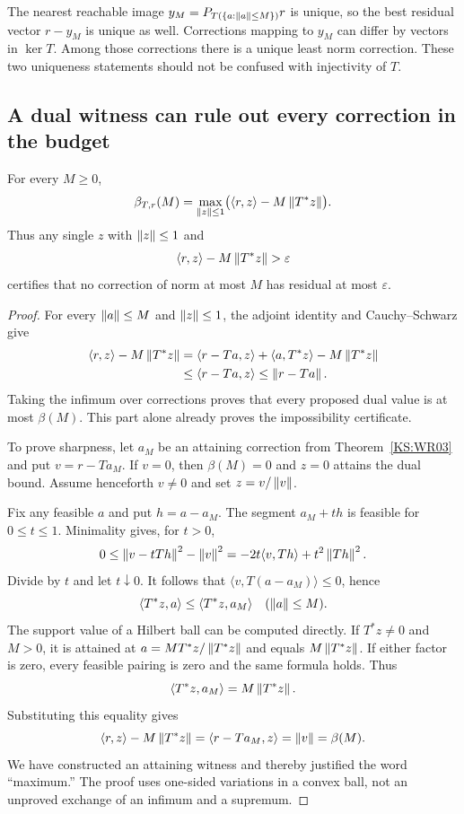 The nearest reachable image $y_M=P_{T(\{a:\left\lVert a\right\rVert\le M\})}r$ is unique, so the best residual vector $r-y_M$ is unique as well. Corrections mapping to $y_M$ can differ by vectors in $\ker T$. Among those corrections there is a unique least norm correction. These two uniqueness statements should not be confused with injectivity of $T$.

\subsection{A dual witness can rule out every correction in the budget}
\begin{KStheorem}\label{KS:WR04}
For every $M\ge0$,
\begin{equation}\label{KS:eq:budget-dual}
 \beta_{T,r}(M)=
 \max_{\left\lVert z\right\rVert\le1}\bigl(\langle r,z\rangle-M\left\lVert T^*z\right\rVert\bigr).
\end{equation}
Thus any single $z$ with $\left\lVert z\right\rVert\le1$ and
\[
 \langle r,z\rangle-M\left\lVert T^*z\right\rVert>\varepsilon
\]
certifies that no correction of norm at most $M$ has residual at most $\varepsilon$.
\end{KStheorem}
\begin{proof}
For every $\left\lVert a\right\rVert\le M$ and $\left\lVert z\right\rVert\le1$, the adjoint identity and Cauchy--Schwarz give
\[
\begin{aligned}
 \langle r,z\rangle-M\left\lVert T^*z\right\rVert
 &=\langle r-Ta,z\rangle+\langle a,T^*z\rangle-M\left\lVert T^*z\right\rVert\\
 &\le\langle r-Ta,z\rangle
 \le\left\lVert r-Ta\right\rVert.
\end{aligned}
\]
Taking the infimum over corrections proves that every proposed dual value is at most $\beta(M)$. This part alone already proves the impossibility certificate.

To prove sharpness, let $a_M$ be an attaining correction from Theorem~\ref{KS:WR03} and put $v=r-Ta_M$. If $v=0$, then $\beta(M)=0$ and $z=0$ attains the dual bound. Assume henceforth $v\ne0$ and set $z=v/\left\lVert v\right\rVert$.

Fix any feasible $a$ and put $h=a-a_M$. The segment $a_M+th$ is feasible for $0\le t\le1$. Minimality gives, for $t>0$,
\[
 0\le\left\lVert v-tTh\right\rVert^2-\left\lVert v\right\rVert^2
   =-2t\langle v,Th\rangle+t^2\left\lVert Th\right\rVert^2.
\]
Divide by $t$ and let $t\downarrow0$. It follows that $\langle v,T(a-a_M)\rangle\le0$, hence
\[
 \langle T^*z,a\rangle\le\langle T^*z,a_M\rangle
 \quad(\left\lVert a\right\rVert\le M).
\]
The support value of a Hilbert ball can be computed directly. If $T^*z\ne0$ and $M>0$, it is attained at $a=M T^*z/\left\lVert T^*z\right\rVert$ and equals $M\left\lVert T^*z\right\rVert$. If either factor is zero, every feasible pairing is zero and the same formula holds. Thus
\[
 \langle T^*z,a_M\rangle=M\left\lVert T^*z\right\rVert.
\]
Substituting this equality gives
\[
 \langle r,z\rangle-M\left\lVert T^*z\right\rVert
 =\langle r-Ta_M,z\rangle=\left\lVert v\right\rVert=\beta(M).
\]
We have constructed an attaining witness and thereby justified the word ``maximum.'' The proof uses one-sided variations in a convex ball, not an unproved exchange of an infimum and a supremum.
\end{proof}

